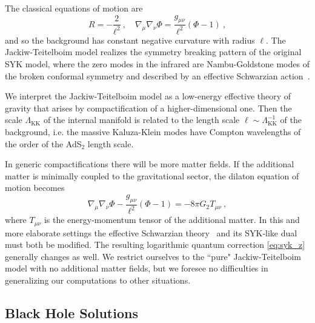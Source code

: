 \documentclass[12pt]{article}
\begin{document}
The classical equations of motion are
\begin{equation}
	R = -\frac{2}{\ell^2}~, \quad \nabla_\mu \nabla_\nu \Phi = \frac{g_{\mu\nu}}{\ell^2}\left(\Phi - 1 \right)~,
	\label{eqn:bkndeom}
\end{equation}
and so the background has constant negative curvature with radius $\ell$. The Jackiw-Teitelboim model realizes the 
symmetry breaking pattern of the original SYK model, where the zero modes in the infrared are Nambu-Goldstone modes of the broken conformal symmetry and described by an effective Schwarzian action~\cite{Maldacena:2016upp}.


We interpret the Jackiw-Teitelboim model as a low-energy effective theory of gravity that arises by compactification of a higher-dimensional one.  Then the scale $\Lambda_\text{KK}$ of the internal manifold is related to the  length scale $\ell\sim \Lambda^{-1}_\text{KK}$ of the background, i.e. the massive Kaluza-Klein modes have Compton wavelengths of the order of the AdS$_2$ length scale. 

In generic compactifications there will be more matter fields. If the additional matter is minimally coupled to the gravitational sector, the dilaton equation of motion becomes
%
\begin{equation}
	\nabla_\mu \nabla_\nu \Phi - \frac{g_{\mu\nu}}{\ell^2}\left(\Phi - 1\right) = - 8 \pi G_2 T_{\mu\nu}~,
\label{eq:dileom_t}
\end{equation}
%
where $T_{\mu\nu}$ is the energy-momentum tensor of the additional matter.  In this and more elaborate settings the effective 
Schwarzian theory~\cite{Liu:2019niv,Sachdev:2019bjn} and its SYK-like dual~\cite{Mertens:2019tcm} must both be modified. The resulting logarithmic quantum correction \eqref{eq:syk_z} generally changes as well. We restrict ourselves to the ``pure" Jackiw-Teitelboim model with no additional matter fields, but we foresee no difficulties in generalizing our computations to other situations. 


\subsection{Black Hole Solutions}
\label{sec:jt:vacuum}
\end{document}
